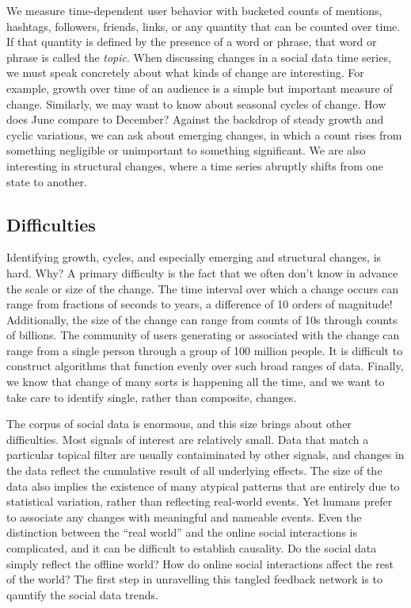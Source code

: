 \documentclass{article}
\begin{document}
We measure time-dependent user behavior with bucketed counts of mentions,
hashtags, followers, friends, links, or any quantity that can be counted over
time. If that quantity is defined by the presence of a word or phrase, that
word or phrase is called the \textit{topic}. When discussing changes in a
social data time series, we must speak concretely about what kinds of change
are interesting. For example, growth over time of an audience is a simple but
important measure of change. Similarly, we may want to know about seasonal
cycles of change. How does June compare to December? Against the backdrop of
steady growth and cyclic variations, we can ask about emerging changes, in
which a count rises from something negligible or unimportant to something
significant. We are also interesting in structural changes, where a time series
abruptly shifts from one state to another.

\subsection{Difficulties} Identifying growth, cycles, and especially emerging
and structural changes, is hard. Why? A primary difficulty is the fact that we
often don't know in advance the scale or size of the change. The time interval
over which a change occurs can range from fractions of seconds to years, a
difference of 10 orders of magnitude! Additionally, the size of the change can range from
counts of 10s through counts of billions. The community of users generating or
associated with the change can range from a single person through a group of
100 million people. It is difficult to construct algorithms that function
evenly over such broad ranges of data. Finally, we know that change of many
sorts is happening all the time, and we want to take care to identify single,
rather than composite, changes.

The corpus of social data is enormous, and this size brings about other
difficulties. Most signals of interest are relatively small.  Data that match a
particular topical filter are usually contaiminated by other signals, and
changes in the data reflect the cumulative result of all underlying effects.
The size of the data also implies the existence of many atypical patterns that
are entirely due to statistical variation, rather than reflecting real-world
events. Yet humans prefer to associate any changes with meaningful and
nameable events. 
Even
the distinction between the “real world” and the online social interactions is
complicated, and it can be
difficult to establish causality. Do the social data simply reflect the offline
world? How do online social interactions affect the rest of the world? 
The first step in unravelling this tangled feedback network is to 
qauntify the social data trends.  
\end{document}
